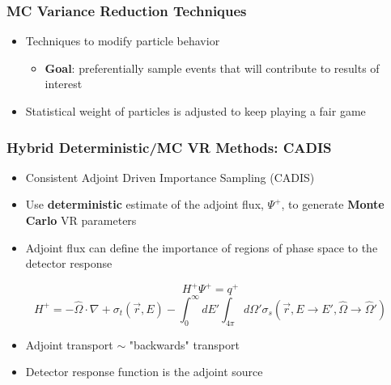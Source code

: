 \documentclass{beamer}
\begin{document}
\begin{frame}
\frametitle{MC Variance Reduction Techniques}
\begin{itemize}
\item{Techniques to modify particle behavior}
\begin{itemize}
	\item{\textbf{Goal}: preferentially sample events that will contribute to results of interest}
\end{itemize}
\item{Statistical weight of particles is adjusted to keep playing a fair game}
\end{itemize}
\end{frame}

\begin{frame}
\frametitle{Hybrid Deterministic/MC VR Methods: CADIS}
\begin{itemize}
\item{Consistent Adjoint Driven Importance Sampling (CADIS)}
\item{Use \textbf{deterministic} estimate of the adjoint flux, $\Psi^+$, to
	generate \textbf{Monte Carlo} VR parameters}
\item{Adjoint flux can define the importance of regions of phase space to the detector response}
\end{itemize}


\vspace{0.2cm}
       \begin{equation}
        H^+\Psi^+ = q^+
       \end{equation} 
       \begin{equation}
	H^{+} = -\widehat{\Omega} \cdot \nabla +
	    \sigma_{t}(\overrightarrow{r},E) - 
		\int_{0}^{\infty} dE'
		\int_{4\pi} d\Omega'
		\sigma_{s}( \overrightarrow{r}, E 
		\rightarrow E', \widehat{\Omega} 
		\rightarrow \widehat{\Omega}' )
       \end{equation}
\begin{itemize}
\item{Adjoint transport $\sim$ "backwards" transport}
\item{Detector response function is the adjoint source}
\end{itemize}
\end{frame}
\end{document}
